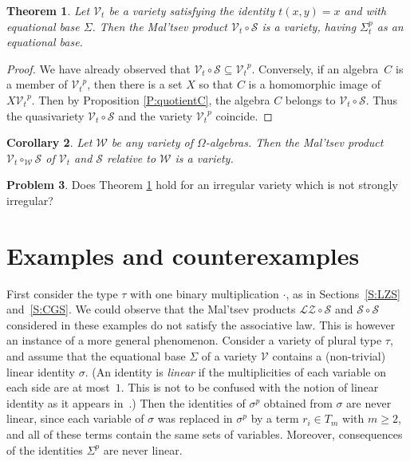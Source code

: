 \documentclass{birkau}
\newcommand{\mc}{\mathcal}
\newcommand{\mcV}{\mathcal{V}}
\newcommand{\mcS}{\mathcal{S}}
\newcommand{\pro}[1]{{#1}^p}
\theoremstyle{plain}
\newtheorem{theorem}{Theorem}[section]
\newtheorem{corollary}[theorem]{Corollary}
\theoremstyle{definition}
\newtheorem{problem}[theorem]{Problem}
\numberwithin{equation}{section}
\begin{document}
\begin{theorem}\label{T:varqvar}
  Let $\mcV_t$ be a variety satisfying the identity $t(x,y)=x$ and with equational base
  $\Sigma$. Then the Mal'tsev product $\mcV_t \circ \mcS$ is a variety, having
  $\Sigma_{t}^{p}$ as an equational base.
\end{theorem}
\begin{proof}
  We have already observed that $\mcV_t \circ \mcS \subseteq \pro{\mcV_t}$. Conversely, if
  an algebra~$C$ is a member of $\pro{\mcV_t}$, then there is a set $X$ so that $C$ is a
  homomorphic image of $X\pro{\mcV_t}$. Then by Proposition \ref{P:quotientC}, the algebra
  $C$ belongs to $\mcV_t \circ \mcS$. Thus the quasivariety $\mcV_t \circ \mcS$ and the
  variety $\pro{\mcV_t}$ coincide.
\end{proof}

\begin{corollary}\label{C:relprod}
Let $\mc{W}$ be any variety of $\Omega$-algebras. Then the Mal'tsev product $\mcV_t \circ_{\mc{W}} \mcS$ of $\mcV_t$ and $\mcS$ relative to $\mc{W}$ is a variety.
\end{corollary}

\begin{problem}
Does Theorem \ref{T:varqvar} hold for an irregular variety which is not strongly irregular?
\end{problem}

\section{Examples and counterexamples}\label{sec:examples}

First consider the type $\tau$ with one binary multiplication $\cdot$, as in
Sections~\ref{S:LZS} and~\ref{S:CGS}. We could observe that the Mal'tsev products
$\mc{LZ} \circ \mcS$ and $\mcS \circ \mcS$ considered in these examples do not satisfy the
associative law. This is however an instance of a more general phenomenon. Consider a
variety of plural type $\tau$, and assume that the equational base $\Sigma$ of a
variety $\mcV$ contains a (non-trivial) linear identity $\sigma$. (An identity is
\emph{linear} if the multiplicities of each variable on each side are at most~$1$. This is
not to be confused with the notion of linear identity as it appears in~\cite{HM88}.) Then
the identities of $\sigma^p$ obtained from $\sigma$ are never linear, since each variable
of $\sigma$ was replaced in $\sigma^p$ by a term $r_i \in T_m$ with $m \geq 2$, and all of
these terms contain the same sets of variables. Moreover, consequences of the identities
$\Sigma^p$ are never linear.
\end{document}
